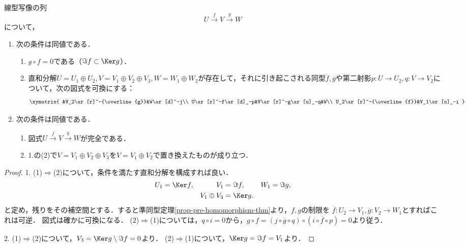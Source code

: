 \documentclass[uplatex, dvipdfmx]{jsreport}
\begin{document}
\begin{proposition}[図式が完全であることの部分空間と直和の言葉による特徴付け]
    線型写像の列
    \[ U\xrightarrow{f}V\xrightarrow{g}W \]
    について，
    \begin{enumerate}
        \item 次の条件は同値である．
        \begin{enumerate}[(1)]
            \item $g\circ f=0$である（$\Im f\subset\Ker g$）．
            \item 直和分解$U=U_1\oplus U_2,V=V_1\oplus V_2\oplus V_3, W=W_1\oplus W_2$が存在して，それに引き起こされる同型$\overline{f},\overline{g}$や第二射影$p:U\to U_2,q:V\to V_2$について，次の図式を可換にする：
            \[\xymatrix{
                &V_2\ar[r]^-{\overline{g}}&W\ar[d]^-j\\
                U\ar[r]^-f\ar[d]_-p&V\ar[r]^-g\ar[u]_-q&W\\
                U_2\ar[r]^-{\overline{f}}&V_1\ar[u]_-i
            }\]
        \end{enumerate}
        \item 次の条件は同値である．
        \begin{enumerate}[(1)]
            \item 図式$U\xrightarrow{f}V\xrightarrow{g}W$が完全である．
            \item 1.の(2)で$V=V_1\oplus V_2\oplus V_3$を$V=V_1\oplus V_2$で置き換えたものが成り立つ．
        \end{enumerate}
    \end{enumerate}
\end{proposition}
\begin{proof}
    1. (1)$\Rightarrow$(2)について，条件を満たす直和分解を構成すれば良い．
    \begin{align*}
        U_1&=\Ker f,&V_1&=\Im f,&W_1&=\Im g,\\
        &&V_1\oplus V_3&=\Ker g.
    \end{align*}
    と定め，残りをその補空間とする．すると準同型定理\ref{prop-pre-homomorphism-thm}より，$f,g$の制限を
    $\overline{f}:U_2\to V_1,\overline{g}:V_2\to W_1$とすればこれは可逆．
    図式は確かに可換になる．
    (2)$\Rightarrow$(1)については，$q\circ i=0$から，$g\circ f=(j\circ\overline{g}\circ q)\circ(i\circ\overline{f}\circ p)=0$より従う．

    2. (1)$\Rightarrow$(2)について，$V_3=\Ker g\setminus\Im f=0$より．
    (2)$\Rightarrow$(1)について，$\Ker g=\Im f= V_1$より．
\end{proof}
\end{document}
